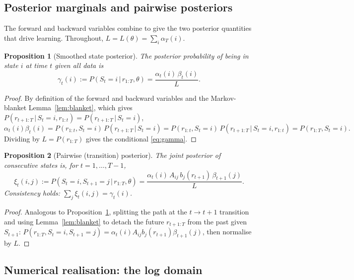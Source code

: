 \documentclass[11pt]{article}
\newcommand{\given}{\,\vert\,}
\newcommand{\eqdef}{:=}
\newcommand{\state}{S}
\newcommand{\obs}{r}
\newcommand{\fwd}{\alpha}
\newcommand{\bwd}{\beta}
\theoremstyle{plain}
\newtheorem{proposition}{Proposition}
\theoremstyle{definition}
\theoremstyle{remark}
\begin{document}
\subsection{Posterior marginals and pairwise posteriors}

The forward and backward variables combine to give the two posterior quantities
that drive learning. Throughout, $L=L(\theta)=\sum_i \fwd_T(i)$.

\begin{proposition}[Smoothed state posterior]\label{prop:gamma}
The posterior probability of being in state $i$ at time $t$ given all data is
\begin{equation}\label{eq:gamma}
  \gamma_t(i)\eqdef P(\state_t=i\given\obs_{1:T},\theta)
  = \frac{\fwd_t(i)\,\bwd_t(i)}{L}.
\end{equation}
\end{proposition}

\begin{proof}
By definition of the forward and backward variables and the Markov-blanket
Lemma~\ref{lem:blanket}, which gives
$P(\obs_{t+1:T}\given\state_t=i,\obs_{1:t})=P(\obs_{t+1:T}\given\state_t=i)$,
\[
  \fwd_t(i)\bwd_t(i)
  = P(\obs_{1:t},\state_t=i)\,P(\obs_{t+1:T}\given\state_t=i)
  = P(\obs_{1:t},\state_t=i)\,P(\obs_{t+1:T}\given\state_t=i,\obs_{1:t})
  = P(\obs_{1:T},\state_t=i).
\]
Dividing by $L=P(\obs_{1:T})$ gives the conditional \eqref{eq:gamma}.
\end{proof}

\begin{proposition}[Pairwise (transition) posterior]\label{prop:xi}
The joint posterior of consecutive states is, for $t=1,\dots,T-1$,
\begin{equation}\label{eq:xi}
  \xi_t(i,j)\eqdef P(\state_t=i,\state_{t+1}=j\given\obs_{1:T},\theta)
  = \frac{\fwd_t(i)\,A_{ij}\,b_j(\obs_{t+1})\,\bwd_{t+1}(j)}{L}.
\end{equation}
Consistency holds: $\sum_{j}\xi_t(i,j)=\gamma_t(i)$.
\end{proposition}

\begin{proof}
Analogous to Proposition~\ref{prop:gamma}, splitting the path at the
$t\!\to\!t\!+\!1$ transition and using Lemma~\ref{lem:blanket} to detach the
future $\obs_{t+1:T}$ from the past given $\state_{t+1}$:
$P(\obs_{1:T},\state_t=i,\state_{t+1}=j)
=\fwd_t(i)A_{ij}b_j(\obs_{t+1})\bwd_{t+1}(j)$, then normalise by $L$.
\end{proof}

\subsection{Numerical realisation: the log domain}\label{sec:logspace}
\end{document}
